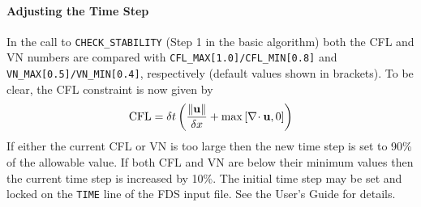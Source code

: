 \documentclass[11pt]{article}
\begin{document}
\paragraph{Adjusting the Time Step} In the call to {\tt CHECK\_STABILITY} (Step 1 in the basic algorithm) both the CFL and VN numbers are compared with {\tt CFL\_MAX[1.0]/CFL\_MIN[0.8]} and {\tt VN\_MAX[0.5]/VN\_MIN[0.4]}, respectively (default values shown in brackets).  To be clear, the CFL constraint is now given by
\begin{equation}
\mbox{CFL} = \delta t \left( \frac{\|\mathbf{u}\|}{\delta x} + \max{[\nabla\!\cdot\mathbf{u},0]} \right)
\end{equation}
If either the current CFL or VN is too large then the new time step is set to 90\% of the allowable value.  If both CFL and VN are below their minimum values then the current time step is increased by 10\%.  The initial time step may be set and locked on the {\tt TIME} line of the FDS input file.  See the User's Guide for details.



%
%
%
%
%
%
\end{document}
